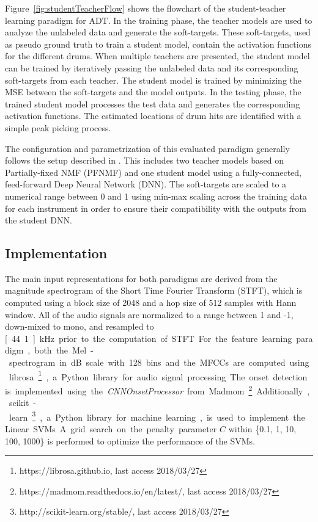 \documentclass{article}
\newcommand{\comment}[1]{{\textcolor{blue}{#1}}}
\begin{document}
Figure~\ref{fig:studentTeacherFlow} shows the flowchart of the student-teacher learning paradigm for ADT. In the training phase, the teacher models are used to analyze the unlabeled data and generate the soft-targets. These soft-targets, used as pseudo ground truth to train a student model, contain the activation functions for the different drums. 
When multiple teachers are presented, the student model can be trained by iteratively passing the unlabeled data and its corresponding soft-targets from each teacher. The student model is trained by minimizing the MSE between the soft-targets and the model outputs. 
In the testing phase, the trained student model processes the test data and generates the corresponding activation functions. The estimated locations of drum hits are identified with a simple peak picking process. 

The configuration and parametrization of this evaluated paradigm generally follows the setup described in \cite{Wu2017}. This includes two teacher models based on Partially-fixed NMF (PFNMF) \cite{Wu2015_ismir} and one student model using a fully-connected, feed-forward Deep Neural Network (DNN). The soft-targets are scaled to a numerical range between 0 and 1 using min-max scaling across the training data for each instrument in order to ensure their compatibility with the outputs from the student DNN. 
\subsection{Implementation}
The main input representations for both paradigms are derived from the magnitude spectrogram of the Short Time Fourier Transform (STFT), which is computed using a block size of 2048 and a hop size of 512 samples with Hann window. All of the audio signals are normalized to a range between 1 and -1, down-mixed to mono, and resampled to \unit[44.1]{kHz} prior to the computation of STFT. %

For the feature learning paradigm, both the Mel-spectrogram in dB scale with 128 bins and the MFCCs are computed using librosa\footnote{https://librosa.github.io, last access 2018/03/27}, a Python library for audio signal processing. The onset detection is implemented using the \textit{CNNOnsetProcessor} from Madmom\footnote{https://madmom.readthedocs.io/en/latest/, last access 2018/03/27}. Additionally, scikit-learn\footnote{http://scikit-learn.org/stable/, last access 2018/03/27}, a Python library for machine learning, is used to implement  the Linear SVMs. A grid search on the penalty parameter $C$ within \{0.1, 1, 10, 100, 1000\} is performed to optimize the performance of the SVMs. 
\end{document}
